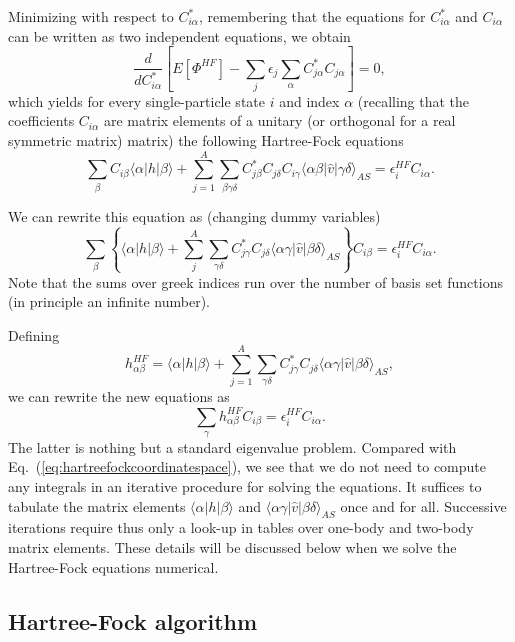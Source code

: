 \documentclass[%
oneside,                 %
final,                   %
10pt]{article}
\begin{document}
Minimizing with respect to $C^*_{i\alpha}$, remembering that the equations for $C^*_{i\alpha}$ and $C_{i\alpha}$
can be written as two  independent equations, we obtain
\[
\frac{d}{dC^*_{i\alpha}}\left[  E[\Phi^{HF}] - \sum_{j}\epsilon_j\sum_{\alpha} C^*_{j\alpha}C_{j\alpha}\right]=0,
\]
which yields for every single-particle state $i$ and index $\alpha$ (recalling that the coefficients $C_{i\alpha}$ are matrix elements of a unitary (or orthogonal for a real symmetric matrix) matrix)
the following Hartree-Fock equations
\[
\sum_{\beta} C_{i\beta}\langle \alpha | h | \beta \rangle+
\sum_{j=1}^A\sum_{\beta\gamma\delta} C^*_{j\beta}C_{j\delta}C_{i\gamma}\langle \alpha\beta|\hat{v}|\gamma\delta\rangle_{AS}=\epsilon_i^{HF}C_{i\alpha}.
\]





We can rewrite this equation as (changing dummy variables)
\[
\sum_{\beta} \left\{\langle \alpha | h | \beta \rangle+
\sum_{j}^A\sum_{\gamma\delta} C^*_{j\gamma}C_{j\delta}\langle \alpha\gamma|\hat{v}|\beta\delta\rangle_{AS}\right\}C_{i\beta}=\epsilon_i^{HF}C_{i\alpha}.
\]
Note that the sums over greek indices run over the number of basis set functions (in principle an infinite number).





Defining 
\[
h_{\alpha\beta}^{HF}=\langle \alpha | h | \beta \rangle+
\sum_{j=1}^A\sum_{\gamma\delta} C^*_{j\gamma}C_{j\delta}\langle \alpha\gamma|\hat{v}|\beta\delta\rangle_{AS},
\]
we can rewrite the new equations as 
\begin{equation}
\sum_{\gamma}h_{\alpha\beta}^{HF}C_{i\beta}=\epsilon_i^{HF}C_{i\alpha}. \label{eq:newhf}
\end{equation}
The latter is nothing but a standard eigenvalue problem. Compared with Eq.~(\ref{eq:hartreefockcoordinatespace}),
we see that we do not need to compute any integrals in an iterative procedure for solving the equations.
It suffices to tabulate the matrix elements $\langle \alpha | h | \beta \rangle$ and $\langle \alpha\gamma|\hat{v}|\beta\delta\rangle_{AS}$ once and for all. Successive iterations require thus only a look-up in tables over one-body and two-body matrix elements. These details will be discussed below when we solve the Hartree-Fock equations numerical. 



\subsection{Hartree-Fock algorithm}
\end{document}
